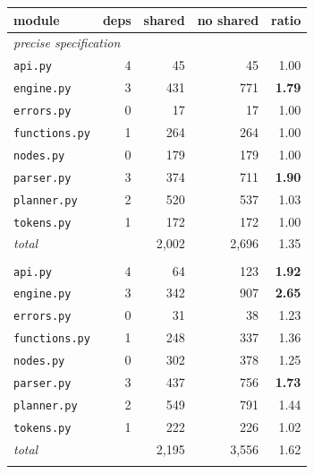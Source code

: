 \begin{tabular}{lrrrr}
\toprule
module & deps & shared & no shared & ratio \\
\midrule
\multicolumn{5}{l}{\emph{precise specification}} \\
\quad\texttt{api.py} & 4 & 45 & 45 & 1.00 \\
\quad\texttt{engine.py} & 3 & 431 & 771 & \textbf{1.79} \\
\quad\texttt{errors.py} & 0 & 17 & 17 & 1.00 \\
\quad\texttt{functions.py} & 1 & 264 & 264 & 1.00 \\
\quad\texttt{nodes.py} & 0 & 179 & 179 & 1.00 \\
\quad\texttt{parser.py} & 3 & 374 & 711 & \textbf{1.90} \\
\quad\texttt{planner.py} & 2 & 520 & 537 & 1.03 \\
\quad\texttt{tokens.py} & 1 & 172 & 172 & 1.00 \\
\quad\emph{total} & & 2,002 & 2,696 & 1.35 \\
\addlinespace
\multicolumn{5}{l}{\emph{vague specification}} \\
\quad\texttt{api.py} & 4 & 64 & 123 & \textbf{1.92} \\
\quad\texttt{engine.py} & 3 & 342 & 907 & \textbf{2.65} \\
\quad\texttt{errors.py} & 0 & 31 & 38 & 1.23 \\
\quad\texttt{functions.py} & 1 & 248 & 337 & 1.36 \\
\quad\texttt{nodes.py} & 0 & 302 & 378 & 1.25 \\
\quad\texttt{parser.py} & 3 & 437 & 756 & \textbf{1.73} \\
\quad\texttt{planner.py} & 2 & 549 & 791 & 1.44 \\
\quad\texttt{tokens.py} & 1 & 222 & 226 & 1.02 \\
\quad\emph{total} & & 2,195 & 3,556 & 1.62 \\
\addlinespace
\bottomrule
\end{tabular}

